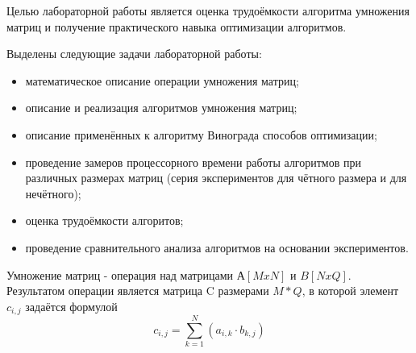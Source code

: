 Целью лабораторной работы является оценка трудоёмкости алгоритма умножения матриц и получение
практического навыка оптимизации алгоритмов.

Выделены следующие задачи лабораторной работы:

\begin{itemize}
\item математическое описание операции умножения матриц;
\item описание и реализация алгоритмов умножения матриц;
\item описание применённых к алгоритму Винограда способов оптимизации;
\item проведение замеров процессорного времени работы алгоритмов при различных размерах матриц 
(серия экспериментов для чётного размера и для нечётного);
\item оценка трудоёмкости алгоритов;
\item проведение сравнительного анализа алгоритмов на основании экспериментов.
\end{itemize}

Умножение матриц - операция над матрицами $ А[MxN] $ и $ B[NxQ] $. Результатом операции является матрица C размерами $ M*Q $, в которой элемент $c_{i,j}$ задаётся формулой
\begin{equation} 
	c_{i,j} = \sum_{k=1}^{N}(a_{i,k} \cdot b_{k,j})
\end{equation}

